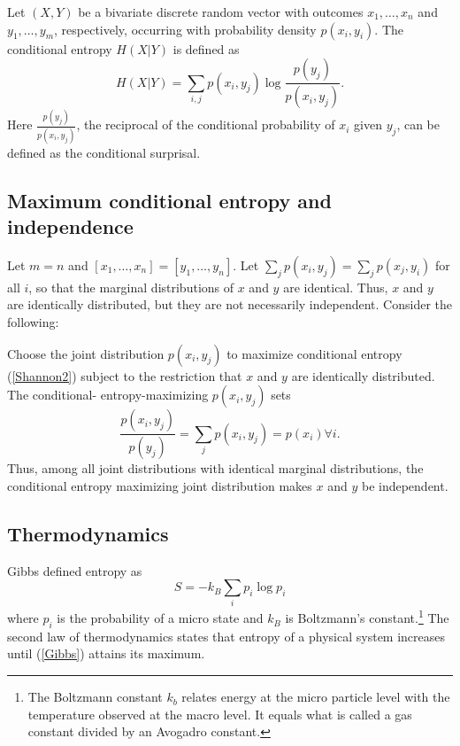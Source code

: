 \begin{subappendices}
Let $(X,Y)$ be a bivariate discrete random vector with  outcomes $x_1, \ldots, x_n$ and $y_1, \ldots, y_m$, respectively,
occurring with probability density $p(x_i, y_i)$.  The conditional entropy $H(X| Y)$ is
defined as
\begin{equation}\label{Shannon2}
H(X | Y) = \sum_{i,j} p(x_i,y_j) \log \frac{p(y_j)}{p(x_i,y_j)}.
\end{equation}
Here $\frac{p(y_j)}{p(x_i,y_j)}$, the reciprocal of the conditional probability of $x_i$ given $y_j$, can be defined
as the conditional surprisal.

\subsection{Maximum conditional entropy and independence}

Let $m=n$ and $[x_1, \ldots, x_n ] = [y_1, \ldots, y_n]$.  Let $\sum_j p(x_i,y_j) = \sum_j p(x_j, y_i) $ for all $i$,
so that the marginal distributions of $x$ and $y$ are identical.  Thus, $x$ and $y$ are identically distributed, but they
are not necessarily independent.
Consider the following:
\begin{problem}\label{Shannon_indep}
Choose the joint distribution  $p(x_i,y_j)$ to maximize  conditional entropy
(\ref{Shannon2}) subject to the restriction that  $x$ and $y$ are identically distributed.  The conditional-
entropy-maximizing  $p(x_i,y_j)$ sets
\[ \frac{p(x_i,y_j)}{p(y_j)} = \sum_j p(x_i, y_j) = p(x_i)  \forall i .\]
Thus, among all joint distributions with identical marginal distributions,
 the conditional entropy maximizing joint distribution makes $x$ and $y$ be
independent.
\end{problem}


\subsection{Thermodynamics}
Gibbs defined entropy as
\begin{equation} \label{Gibbs}
S= - k_B \sum_i p_i  \log p_i
\end{equation}
where $p_i$ is the probability of a micro state and $k_B$ is Boltzmann's constant.\footnote{The Boltzmann constant $k_b$ relates energy at the micro  particle level with the temperature observed at the macro level. It equals what is called a gas constant  divided by an Avogadro constant.}
The second law of thermodynamics states that entropy of a physical system increases until (\ref{Gibbs}) attains its maximum.





\end{subappendices}
